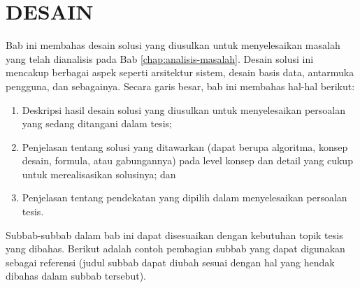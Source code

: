 
\cleardoublepage
\chapter{DESAIN}
\label{chap:desain}
Bab ini membahas desain solusi yang diusulkan untuk menyelesaikan masalah yang telah dianalisis pada Bab \ref{chap:analisis-masalah}. Desain solusi ini mencakup berbagai aspek seperti arsitektur sistem, desain basis data, antarmuka pengguna, dan sebagainya. Secara garis besar, bab ini membahas hal-hal berikut:
\begin{enumerate}[1.]
    \item Deskripsi hasil desain solusi yang diusulkan untuk menyelesaikan persoalan yang sedang ditangani dalam tesis;
    \item Penjelasan tentang solusi yang ditawarkan (dapat berupa algoritma, konsep desain, formula, atau gabungannya) pada level konsep dan detail yang cukup untuk merealisasikan solusinya; dan
    \item Penjelasan tentang pendekatan yang dipilih dalam menyelesaikan persoalan tesis.
\end{enumerate}
Subbab-subbab dalam bab ini dapat disesuaikan dengan kebutuhan topik tesis yang dibahas. Berikut adalah contoh pembagian subbab yang dapat digunakan sebagai referensi (judul subbab dapat diubah sesuai dengan hal yang hendak dibahas dalam subbab tersebut).